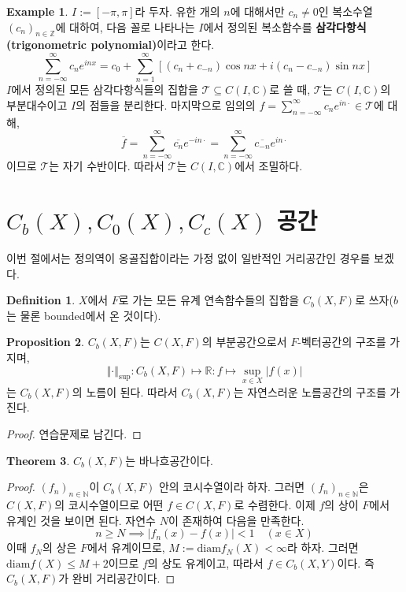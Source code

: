 \documentclass[11pt]{book}
\numberwithin{equation}{chapter}
\def\NN{\mathbb{N}}
\def\ZZ{\mathbb{Z}}
\def\RR{\mathbb{R}}
\def\CC{\mathbb{C}}
\def\calT{\mathcal{T}}
\newcommand{\abs}[1]{\left\vert#1\right\vert}
\newcommand{\norm}[1]{\left\Vert#1\right\Vert}
\def\diam{\text{diam}}
\theoremstyle{definition}
\newtheorem{thm}{Theorem}[section]
\newtheorem{prop}[thm]{Proposition}
\newtheorem{defn}[thm]{Definition}
\newtheorem*{ex}{Example}
\begin{document}
\begin{ex}
    \(I := [-\pi, \pi]\)라 두자. 유한 개의 \(n\)에 대해서만 \(c_n \ne 0\)인 복소수열 \((c_n)_{n \in \ZZ}\)에 대하여, 다음 꼴로 나타나는 \(I\)에서 정의된 복소함수를 \textbf{삼각다항식(trigonometric polynomial)}이라고 한다.
    \[
    \sum_{n=-\infty}^\infty c_n e^{inx} = c_0 + \sum_{n=1}^\infty [(c_n + c_{-n})\cos nx + i(c_n - c_{-n})\sin nx]
    \]
    \(I\)에서 정의된 모든 삼각다항식들의 집합을 \(\calT \subseteq C(I, \CC)\)로 쓸 때, \(\calT\)는 \(C(I, \CC)\)의 부분대수이고 \(I\)의 점들을 분리한다. 마지막으로 임의의 \(f = \sum_{n=-\infty}^\infty c_n e^{in\cdot} \in \calT\)에 대해,
    \[
    \overline{f} = \sum_{n=-\infty}^\infty \overline{c_{n}} e^{-in\cdot}= \sum_{n=-\infty}^\infty \overline{c_{-n}} e^{in\cdot}
    \]
    이므로 \(\calT\)는 자기 수반이다. 따라서 \(\calT\)는 \(C(I, \CC)\)에서 조밀하다.
\end{ex}

\section{\(C_b(X), C_0(X), C_c(X)\) 공간}

이번 절에서는 정의역이 옹골집합이라는 가정 없이 일반적인 거리공간인 경우를 보겠다.

\begin{defn}
    \(X\)에서 \(F\)로 가는 모든 유계 연속함수들의 집합을 \(C_b(X, F)\)로 쓰자(\(b\)는 물론 bounded에서 온 것이다).
\end{defn}

\begin{prop}
    \(C_b(X, F)\)는 \(C(X, F)\)의 부분공간으로서 \(F\)-벡터공간의 구조를 가지며,
    \[
    \norm{\cdot}_{\sup} : C_b(X, F) \mapsto \RR : f \mapsto \sup_{x \in X} \abs{f(x)}    
    \]
    는 \(C_b(X, F)\)의 노름이 된다. 따라서 \(C_b(X, F)\)는 자연스러운 노름공간의 구조를 가진다.
\end{prop}
\begin{proof}
    연습문제로 남긴다.
\end{proof}

\begin{thm} \label{10.4.3}
    \(C_b(X, F)\)는 바나흐공간이다.
\end{thm}
\begin{proof}
    \((f_n)_{n \in \NN}\)이 \(C_b(X, F)\) 안의 코시수열이라 하자. 그러면 \((f_n)_{n \in \NN}\)은 \(C(X, F)\)의 코시수열이므로 어떤 \(f \in C(X, F)\)로 수렴한다. 이제 \(f\)의 상이 \(F\)에서 유계인 것을 보이면 된다. 자연수 \(N\)이 존재하여 다음을 만족한다.
    \[
    n \ge N \implies \abs{f_n(x) - f(x)} < 1 \quad (x \in X)    
    \]
    이때 \(f_N\)의 상은 \(F\)에서 유계이므로, \(M := \diam f_N(X) < \infty\)라 하자. 그러면 \(\diam f(X) \le M+2\)이므로 \(f\)의 상도 유계이고, 따라서 \(f \in C_b(X, Y)\)이다. 즉 \(C_b(X, F)\)가 완비 거리공간이다.
\end{proof}
\end{document}

